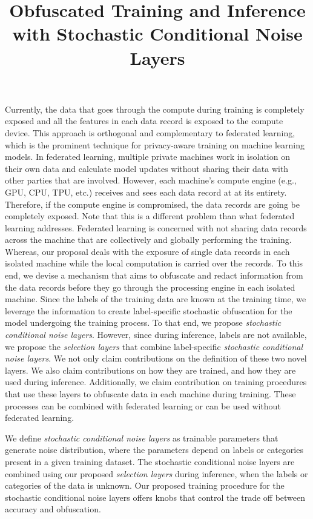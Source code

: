 \documentclass[12pt, letterpaper]{article}
\title{Obfuscated Training and Inference with Stochastic Conditional Noise Layers}
\date{}
\begin{document}
\vspace{-5cm}
\maketitle
\vspace{-2cm}
\noindent 
Currently, the data that goes through the compute during training is completely exposed and all the features in each data record is exposed to the compute device.
%
This approach is orthogonal and complementary to federated learning, which is the prominent technique for privacy-aware training on machine learning models.
%
In federated learning, multiple private machines work in isolation on their own data and calculate model updates without sharing their data with other parties that are involved.
%
However, each machine's compute engine (e.g., GPU, CPU, TPU, etc.) receives and sees each data record at at its entirety.
%
Therefore, if the compute engine is compromised, the data records are going be completely exposed.
%
Note that this is a different problem than what federated learning addresses.
%
Federated learning is concerned with not sharing data records across the machine that are collectively and globally performing the training.
%
Whereas, our proposal deals with the exposure of single data records in each isolated machine while the local computation is carried over the records.
%
To this end, we devise a mechanism that aims to obfuscate and redact information from the data records before they go through the processing engine in each isolated machine.
%
Since the labels of the training data are known at the training time, we leverage the information to create label-specific stochastic obfuscation for the model undergoing the training process.
%
To that end, we propose \emph{stochastic conditional noise layers}.
%
However, since during inference, labels are not available, we propose the \emph{selection layers} that  combine label-specific \emph{stochastic conditional noise layers}.
%
We not only claim contributions on the definition of these two novel layers.
%
We also claim contributions on how they are trained, and how they are used during inference.
%
Additionally, we claim contribution on training procedures that use these layers to obfuscate data in each machine during training.
%
These processes can be combined with federated learning or can be used without federated learning.

%
We define \emph{stochastic conditional noise layers} as trainable parameters that generate noise distribution, where the parameters depend on labels or categories present in a given training dataset.
%
The stochastic conditional noise layers are combined using our proposed \emph{selection layers} during inference, when the labels or categories of the data is unknown.
%
Our proposed training procedure for the stochastic conditional noise layers offers knobs that control the trade off between accuracy and obfuscation.
\vspace{-0.4cm}
\end{document}
